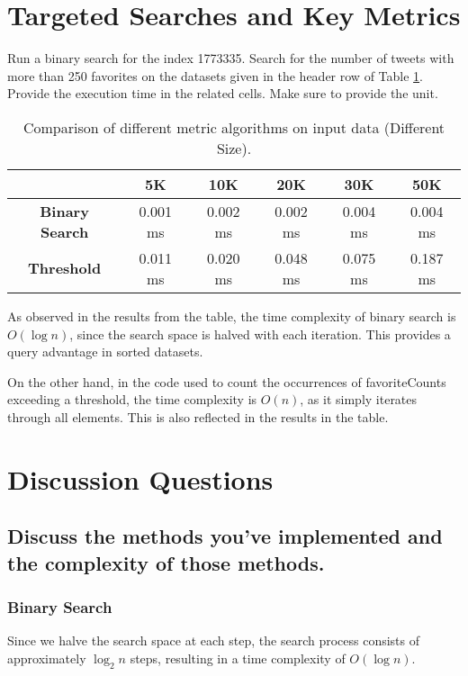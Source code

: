 \section{Targeted Searches and Key Metrics}

Run a binary search for the index 1773335. Search for the number of tweets with more than 250 favorites on the datasets given in the header row of Table \ref{dataSizeMetric}. Provide the execution time in the related cells. Make sure to provide the unit. 

\begin{table}[h!]
\centering
\begin{tabular}{|c|c|c|c|c|c|}
\hline
& \textbf{5K} & \textbf{10K} & \textbf{20K} & \textbf{30K} & \textbf{50K} \\ \hline
\textbf{Binary Search} & 0.001 ms & 0.002 ms & 0.002 ms & 0.004 ms & 0.004 ms \\ \hline
\textbf{Threshold} & 0.011 ms & 0.020 ms & 0.048 ms & 0.075 ms & 0.187 ms \\ \hline
\end{tabular}
\caption{Comparison of different metric algorithms on input data (Different Size). }
\label{dataSizeMetric}
\end{table}

As observed in the results from the table, the time complexity of binary search is \(O(\log n)\), since the search space is halved with each iteration. This provides a query advantage in sorted datasets.

On the other hand, in the code used to count the occurrences of favoriteCounts exceeding a threshold, the time complexity is \(O(n)\), as it simply iterates through all elements. This is also reflected in the results in the table.

\section{Discussion Questions}

\subsection*{Discuss the methods you've implemented and the complexity of those methods.}

\subsubsection*{\small Binary Search}

Since we halve the search space at each step, the search process consists of approximately \(\log_2 n\) steps, resulting in a time complexity of \(O(\log n)\).

